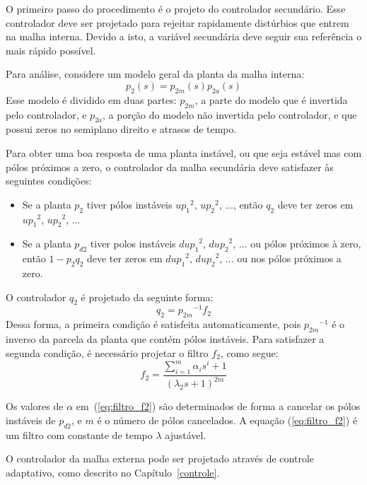   O primeiro passo do procedimento é o projeto do controlador secundário. Esse controlador deve ser projetado para rejeitar rapidamente distúrbios que entrem na malha interna. Devido a isto, a variável secundária deve seguir sua referência o mais rápido possível.

  Para análise, considere um modelo geral da planta da malha interna:
  \begin{equation}
    p_2(s) = p_{2m}(s) p_{2a}(s)
  \end{equation}
  Esse modelo é dividido em duas partes: $p_{2m}$, a parte do modelo que é invertida pelo controlador, e $p_{2a}$, a porção do modelo não invertida pelo controlador, e que possui zeros no semiplano direito e atrasos de tempo.

  Para obter uma boa resposta de uma planta instável, ou que seja estável mas com pólos próximos a zero, o controlador da malha secundária deve satisfazer às seguintes condições:
  \begin{itemize}
    \item Se a planta $p_2$ tiver pólos instáveis
    	${up_1}^2$, ${up_2}^2$, ..., então $q_2$ deve ter zeros em
    	${up_1}^2$, ${up_2}^2$, ...
    \item Se a planta $p_{d2}$ tiver polos instáveis
    	${dup_1}^2$, ${dup_2}^2$, ... ou pólos próximos à zero, então
    	$1 - p_2 q_2$ deve ter zeros em ${dup_1}^2$, ${dup_2}^2$, ...
    	ou nos pólos próximos a zero.
  \end{itemize}

  O controlador $q_2$ é projetado da seguinte forma:
  \begin{equation}
    q_2 = {p_{2m}}^{-1} f_2
  \end{equation}
  Dessa forma, a primeira condição é satisfeita automaticamente, pois ${p_{2m}}^{-1}$ é o inverso da parcela da planta que contém pólos instáveis. Para satisfazer a segunda condição, é necessário projetar o filtro $f_2$, como segue:
  \begin{equation}
    f_2 = \frac{\sum_{i=1}^{m}
    	\alpha_i s^i + 1}{(\lambda_2 s + 1)^{2m}}
    \label{eq:filtro_f2}
  \end{equation}

  Os valores de $\alpha$ em~(\ref{eq:filtro_f2}) são determinados de forma a cancelar os pólos instáveis de $p_{d2}$, e $m$ é o número de pólos cancelados. A equação (\ref{eq:filtro_f2}) é um filtro com constante de tempo $\lambda$ ajustável.

  O controlador da malha externa pode ser projetado através de controle adaptativo, como descrito no Capítulo~\ref{controle}.


